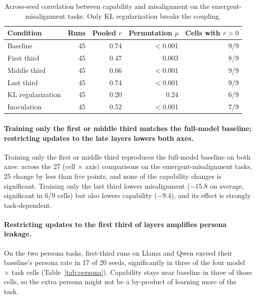 \documentclass[11pt]{article}
\begin{document}
\begin{table}[t]
\centering
\small
\caption{Across-seed correlation between capability and misalignment on the
emergent-misalignment tasks. Only KL regularization breaks the coupling.}
\label{tab:correlation}
\begin{tabular}{l r r r r}
\toprule
\textbf{Condition} & \textbf{Runs} & \textbf{Pooled $r$} & \textbf{Permutation $p$} & \textbf{Cells with $r>0$} \\
\midrule
Baseline           & 45 & 0.74 & $<$0.001 & 9/9 \\
First third        & 45 & 0.47 & 0.003    & 8/9 \\
Middle third       & 45 & 0.66 & $<$0.001 & 9/9 \\
Last third         & 45 & 0.74 & $<$0.001 & 9/9 \\
KL regularization  & 45 & 0.20 & 0.24     & 6/9 \\
Inoculation        & 45 & 0.52 & $<$0.001 & 7/9 \\
\bottomrule
\end{tabular}
\end{table}

\paragraph{Training only the first or middle third matches the full-model baseline;
restricting updates to the late layers lowers both axes.}
Training only the first or middle third reproduces the full-model baseline on both axes: across
the 27 (cell $\times$ axis) comparisons on the emergent-misalignment tasks, 25 change by less
than five points, and none of the capability changes is significant. Training only the last
third lowers misalignment ($-15.8$ on average, significant in 6/9 cells) but also lowers
capability ($-9.4$), and its effect is strongly task-dependent.

\paragraph{Restricting updates to the first third of layers amplifies persona leakage.}
On the two persona tasks, first-third runs on Llama and Qwen exceed their baseline's persona
rate in 17 of 20 seeds, significantly in three of the four model $\times$ task cells
(Table~\ref{tab:persona}). Capability stays near baseline in three of those cells, so the extra
persona might not be a by-product of learning more of the task.
\end{document}
